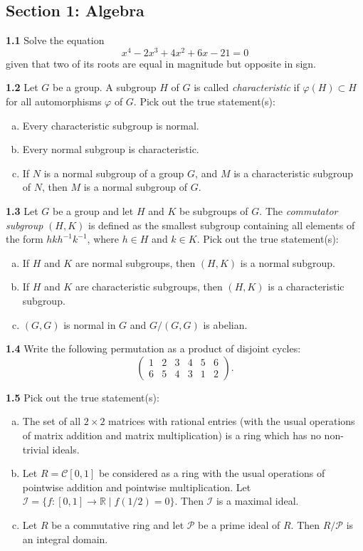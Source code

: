 \documentclass[11pt,a4paper]{article}
\newcommand{\R}{\mathbb{R}}
\newcommand{\examsec}[1]{%
  \subsection*{#1}
  \vspace{-2pt}
}
\newcommand{\qitem}[1]{\par\medskip\noindent\textbf{#1}\hspace{0.5em}}
\begin{document}
\examsec{Section 1: Algebra}

\qitem{1.1} Solve the equation
\[
  x^4 - 2x^3 + 4x^2 + 6x - 21 = 0
\]
given that two of its roots are equal in magnitude but opposite in sign.

\qitem{1.2} Let $G$ be a group. A subgroup $H$ of $G$ is called \emph{characteristic} if $\varphi(H) \subset H$ for all automorphisms $\varphi$ of $G$. Pick out the true statement(s):
\begin{enumerate}[(a)]
  \item Every characteristic subgroup is normal.
  \item Every normal subgroup is characteristic.
  \item If $N$ is a normal subgroup of a group $G$, and $M$ is a characteristic subgroup of $N$, then $M$ is a normal subgroup of $G$.
\end{enumerate}

\qitem{1.3} Let $G$ be a group and let $H$ and $K$ be subgroups of $G$. The \emph{commutator subgroup} $(H, K)$ is defined as the smallest subgroup containing all elements of the form $hkh^{-1}k^{-1}$, where $h \in H$ and $k \in K$. Pick out the true statement(s):
\begin{enumerate}[(a)]
  \item If $H$ and $K$ are normal subgroups, then $(H, K)$ is a normal subgroup.
  \item If $H$ and $K$ are characteristic subgroups, then $(H, K)$ is a characteristic subgroup.
  \item $(G, G)$ is normal in $G$ and $G/(G, G)$ is abelian.
\end{enumerate}

\qitem{1.4} Write the following permutation as a product of disjoint cycles:
\[
  \begin{pmatrix} 1 & 2 & 3 & 4 & 5 & 6 \\ 6 & 5 & 4 & 3 & 1 & 2 \end{pmatrix}.
\]

\qitem{1.5} Pick out the true statement(s):
\begin{enumerate}[(a)]
  \item The set of all $2 \times 2$ matrices with rational entries (with the usual operations of matrix addition and matrix multiplication) is a ring which has no non-trivial ideals.
  \item Let $R = \mathcal{C}[0, 1]$ be considered as a ring with the usual operations of pointwise addition and pointwise multiplication. Let $\mathcal{I} = \{f : [0, 1] \to \R \mid f(1/2) = 0\}$. Then $\mathcal{I}$ is a maximal ideal.
  \item Let $R$ be a commutative ring and let $\mathcal{P}$ be a prime ideal of $R$. Then $R/\mathcal{P}$ is an integral domain.
\end{enumerate}
\end{document}
